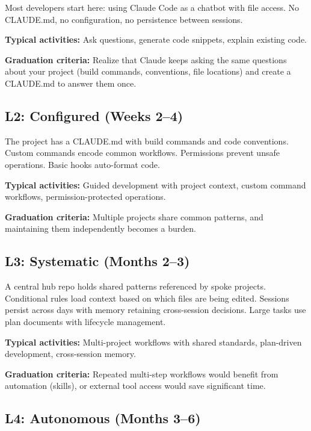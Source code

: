 Most developers start here: using Claude Code as a chatbot with file access.
No CLAUDE.md, no configuration, no persistence between sessions.

\textbf{Typical activities:} Ask questions, generate code snippets,
explain existing code.

\textbf{Graduation criteria:} Realize that Claude keeps asking the same
questions about your project (build commands, conventions, file locations)
and create a CLAUDE.md to answer them once.

\subsection{L2: Configured (Weeks 2--4)}

The project has a CLAUDE.md with build commands and code conventions.
Custom commands encode common workflows. Permissions prevent unsafe operations.
Basic hooks auto-format code.

\textbf{Typical activities:} Guided development with project context,
custom command workflows, permission-protected operations.

\textbf{Graduation criteria:} Multiple projects share common patterns,
and maintaining them independently becomes a burden.

\subsection{L3: Systematic (Months 2--3)}


A central hub repo holds shared patterns referenced by spoke projects.
Conditional rules load context based on which files are being edited.
Sessions persist across days with memory retaining cross-session decisions.
Large tasks use plan documents with lifecycle management.

\textbf{Typical activities:} Multi-project workflows with shared standards,
plan-driven development, cross-session memory.

\textbf{Graduation criteria:} Repeated multi-step workflows would benefit
from automation (skills), or external tool access would save significant time.

\subsection{L4: Autonomous (Months 3--6)}

